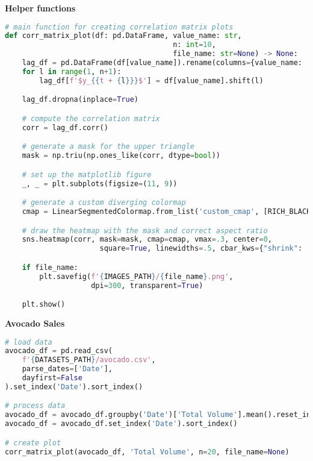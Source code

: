 {\noindent\hspace{-12.5pt}\normalsize\bfseries Helper functions}\vspace{-10pt}
\begin{center}
  \begin{lstlisting}[language=Python]
# main function for creating correlation matrix plots
def corr_matrix_plot(df: pd.DataFrame, value_name: str, 
                                       n: int=10, 
                                       file_name: str=None) -> None:
    lag_df = pd.DataFrame(df[value_name]).rename(columns={value_name: '$y_t$'})
    for l in range(1, n+1):
        lag_df[f'$y_{{t + {l}}}$'] = df[value_name].shift(l)

    lag_df.dropna(inplace=True)

    # compute the correlation matrix
    corr = lag_df.corr()

    # generate a mask for the upper triangle
    mask = np.triu(np.ones_like(corr, dtype=bool))

    # set up the matplotlib figure
    _, _ = plt.subplots(figsize=(11, 9))

    # generate a custom diverging colormap
    cmap = LinearSegmentedColormap.from_list('custom_cmap', [RICH_BLACK, RED])

    # draw the heatmap with the mask and correct aspect ratio
    sns.heatmap(corr, mask=mask, cmap=cmap, vmax=.3, center=0,
                      square=True, linewidths=.5, cbar_kws={"shrink": .5})

    if file_name:
        plt.savefig(f'{IMAGES_PATH}/{file_name}.png', 
                    dpi=300, transparent=True)

    plt.show()
  \end{lstlisting}
\end{center}


{\noindent\hspace{-12.5pt}\normalsize\bfseries Avocado Sales}\vspace{-10pt}
\begin{center}
  \begin{lstlisting}[language=Python, 
  caption={Диагональная корреляционная матрица объема продаж авокадо.}, 
  label={lst:correlation_matrix_avocado}]
# load data
avocado_df = pd.read_csv(
    f'{DATASETS_PATH}/avocado.csv',
    parse_dates=['Date'],
    dayfirst=False
).set_index('Date').sort_index()

# process data
avocado_df = avocado_df.groupby('Date')['Total Volume'].mean().reset_index()
avocado_df = avocado_df.set_index('Date').sort_index()

# create plot
corr_matrix_plot(avocado_df, 'Total Volume', n=20, file_name=None)
  \end{lstlisting}
\end{center}

